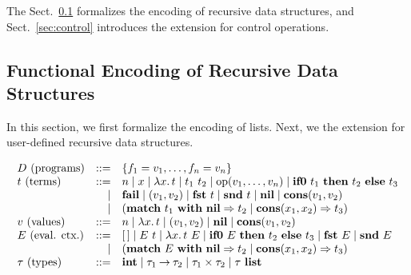 The Sect.~\ref{sec:recdata} formalizes the encoding of recursive data
structures, and Sect.~\ref{sec:control} introduces the extension for
control operations.

\subsection{Functional Encoding of Recursive Data Structures}
\label{sec:recdata}

In this section, we first formalize the encoding of lists. Next, we  the
extension for user-defined recursive data structures.

\[
\begin{array}{lrl}
D\text{ (programs)} &::=& \{f_1 = v_1, \dots, f_n = v_n\} \\
t\text{ (terms)}
  &::=& n \mid x \mid \lambda{x}.\,{t} \mid t_1\ t_2 \mid \mathrm{op}({v_1,\dots,v_n}) \mid \mathbf{if0}~{t_1}~\mathbf{then}~{t_2}~\mathbf{else}~{t_3} \\
 &\mid& \mathbf{fail} \mid ({v_1},{v_2}) \mid {\mathbf{fst}}~{t} \mid {\mathbf{snd}}~{t} \mid \mathbf{nil} \mid \mathbf{cons}({v_1},{v_2}) \\
 &\mid& (\mathbf{match}\ {t_1}\ \mathbf{with}\ \mathbf{nil} \Rightarrow {t_2} \mid \mathbf{cons}({x_1},{x_2}) \Rightarrow {t_3}) \\

v\text{ (values)}
  &::=& n \mid \lambda{x}.\,{t} \mid ({v_1},{v_2}) \mid \mathbf{nil} \mid \mathbf{cons}({v_1},{v_2}) \\

E\text{ (eval. ctx.)}
  &::=& [\,] \mid E\ t \mid {\lambda{x}.\,{t}}~{E} \mid \mathbf{if0}~{E}~\mathbf{then}~{t_2}~\mathbf{else}~{t_3} \mid {\mathbf{fst}}~{E} \mid {\mathbf{snd}}~{E} \\
 &\mid& (\mathbf{match}\ {E}\ \mathbf{with}\ \mathbf{nil} \Rightarrow {t_2} \mid \mathbf{cons}({x_1},{x_2}) \Rightarrow {t_3}) \\

\tau\text{ (types)} &::=& \mathbf{int} \mid {\tau_1}\mathbin{\rightarrow}{\tau_2} \mid {\tau_1}\mathbin{\times}{\tau_2} \mid {\tau}\ \mathbf{list} \\
\end{array}
\]

